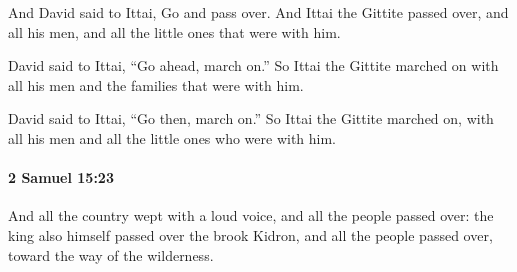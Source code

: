			\begin{versebox}
					\item[BHS] 
					\item[ASV] And David said to Ittai, Go and pass over. And Ittai the Gittite passed over, and all his men, and all the little ones that were with him.
					\item[NIV] David said to Ittai, “Go ahead, march on.” So Ittai the Gittite marched on with all his men and the families that were with him.
					\item[NRSV] David said to Ittai, “Go then, march on.” So Ittai the Gittite marched on, with all his men and all the little ones who were with him.
			\end{versebox}

		\paragraph{2 Samuel 15:23} %
			\label{2SAMUEL-15-23}

			And all the country wept with a loud voice, and all the people passed over: the king also himself passed over the brook Kidron, and all the people passed over, toward the way of the wilderness.

